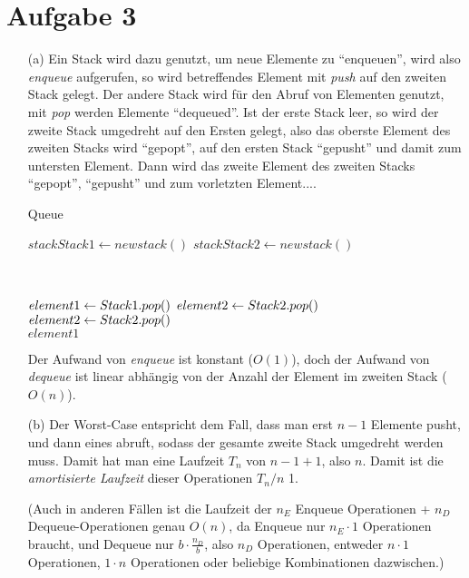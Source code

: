 \documentclass{scrartcl}
\begin{document}
\section{Aufgabe 3}
\begin{enumerate}
\item[(a)]
Ein Stack wird dazu genutzt, um neue Elemente zu "`enqueuen"', wird 
also \textit{enqueue} aufgerufen, so wird betreffendes Element mit 
\textit{push} auf den zweiten Stack gelegt. Der andere Stack wird 
für den Abruf von Elementen genutzt, mit \textit{pop} werden Elemente 
"`dequeued"'. Ist der erste Stack leer, so wird der zweite Stack 
umgedreht auf den Ersten gelegt, also das oberste Element des zweiten 
Stacks wird "`gepopt"', auf den ersten Stack "`gepusht"' und damit 
zum untersten Element. Dann wird das zweite Element des zweiten Stacks 
"`gepopt"', "`gepusht"' und zum vorletzten Element....

\begin{algorithm}
\caption{Queue}
\begin{algorithmic}[1]
\State $stack Stack1 \gets new stack()$
\State $stack Stack2 \gets new stack()$

 \\
\EndFunction

\State $element1 \gets \Call{$Stack1.pop$}$
\State	$element2 \gets \Call{$Stack2.pop$}$
		\State $element2 \gets \Call{$Stack2.pop$}$
	\EndWhile
\Else \\
	\Return $element1$
\EndIf
\EndFunction
\end{algorithmic}
\end{algorithm}

Der Aufwand von \textit{enqueue} ist konstant ($O(1)$), doch der Aufwand 
von \textit{dequeue} ist linear abhängig von der Anzahl der Element im 
zweiten Stack ($O(n)$).

\item[(b)]
Der Worst-Case entspricht dem Fall, dass man erst $n-1$ Elemente 
pusht, und dann eines abruft, sodass der gesamte zweite Stack 
umgedreht werden muss. Damit hat man eine Laufzeit $T_n$ von $n-1+1$, 
also $n$. Damit ist die \textit{amortisierte Laufzeit} dieser 
Operationen $T_n/n$ 1. 

(Auch in anderen Fällen ist die Laufzeit der $n_E$ Enqueue Operationen 
+ $n_D$ Dequeue-Operationen genau $O(n)$, da Enqueue nur $n_E \cdot 1$ 
Operationen braucht, und Dequeue nur $b \cdot \frac{n_D}{b}$, also 
$n_D$ Operationen, entweder $n \cdot 1$ Operationen, $1 \cdot n$ 
Operationen oder beliebige Kombinationen dazwischen.)
\end{enumerate}
\end{document}
